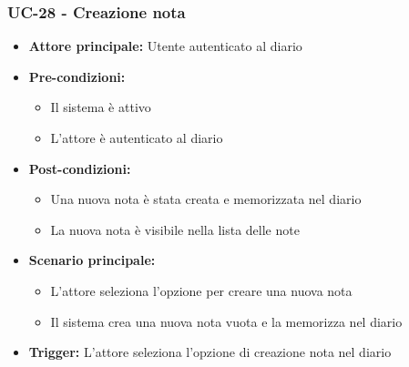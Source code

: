 \documentclass[a4paper,12pt]{article}
\begin{document}
\subsubsection{UC-28 - Creazione nota} \label{subsec:UC-28}
\begin{itemize}
    \item \textbf{Attore principale:} Utente autenticato al diario
    \item \textbf{Pre-condizioni:}
    \begin{itemize}
        \item Il sistema è attivo
        \item L'attore è autenticato al diario
    \end{itemize}
    \item \textbf{Post-condizioni:} 
    \begin{itemize}
        \item Una nuova nota è stata creata e memorizzata nel diario
        \item La nuova nota è visibile nella lista delle note
    \end{itemize}
    \item \textbf{Scenario principale:} 
    \begin{itemize}
        \item L'attore seleziona l'opzione per creare una nuova nota
        \item Il sistema crea una nuova nota vuota e la memorizza nel diario
    \end{itemize}
    \item \textbf{Trigger:} L'attore seleziona l'opzione di creazione nota nel diario
\end{itemize}
\end{document}
